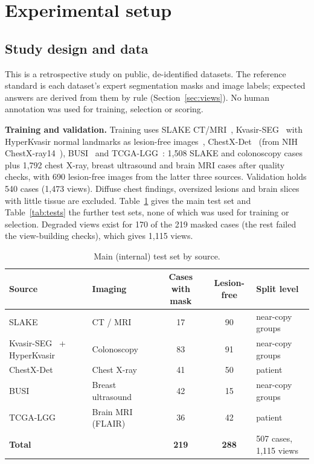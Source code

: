 \documentclass[11pt]{article}
\begin{document}
\section{Experimental setup}

\subsection{Study design and data}\label{sec:data}
This is a retrospective study on public, de-identified datasets. The reference standard is each dataset's expert segmentation masks and image labels; expected answers are derived from them by rule (Section~\ref{sec:views}). No human annotation was used for training, selection or scoring.

\textbf{Training and validation.} Training uses SLAKE CT/MRI~\cite{slake}, Kvasir-SEG~\cite{kvasir} with HyperKvasir normal landmarks as lesion-free images~\cite{hyperkvasir}, ChestX-Det~\cite{chestxdet} (from NIH ChestX-ray14~\cite{chestxray14}), BUSI~\cite{busi} and TCGA-LGG~\cite{lgg}: 1,508 SLAKE and colonoscopy cases plus 1,792 chest X-ray, breast ultrasound and brain MRI cases after quality checks, with 690 lesion-free images from the latter three sources. Validation holds 540 cases (1,473 views). Diffuse chest findings, oversized lesions and brain slices with little tissue are excluded. Table~\ref{tab:data} gives the main test set and Table~\ref{tab:tests} the further test sets, none of which was used for training or selection. Degraded views exist for 170 of the 219 masked cases (the rest failed the view-building checks), which gives 1,115 views.

\begin{table}[t]
\centering\footnotesize
\caption{Main (internal) test set by source.}
\label{tab:data}
\begin{tabular}{llccl}
\toprule
Source & Imaging & Cases with mask & Lesion-free & Split level \\
\midrule
SLAKE~\cite{slake} & CT / MRI & 17 & 90 & near-copy groups \\
Kvasir-SEG~\cite{kvasir} + HyperKvasir~\cite{hyperkvasir} & Colonoscopy & 83 & 91 & near-copy groups \\
ChestX-Det~\cite{chestxdet} & Chest X-ray & 41 & 50 & patient \\
BUSI~\cite{busi} & Breast ultrasound & 42 & 15 & near-copy groups \\
TCGA-LGG~\cite{lgg} & Brain MRI (FLAIR) & 36 & 42 & patient \\
\midrule
\textbf{Total} & & \textbf{219} & \textbf{288} & 507 cases, 1,115 views \\
\bottomrule
\end{tabular}
\end{table}
\end{document}
